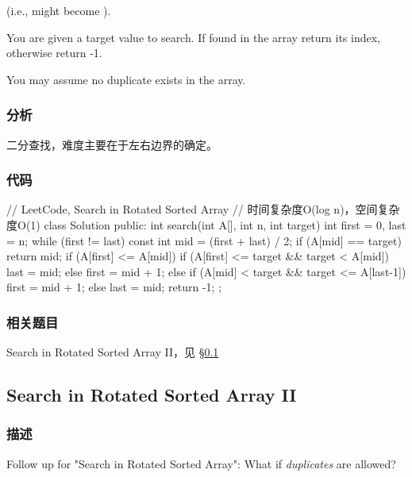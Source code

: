 (i.e.,  might become ).

You are given a target value to search. If found in the array return its index, otherwise return -1.

You may assume no duplicate exists in the array.


\subsubsection{分析}
二分查找，难度主要在于左右边界的确定。


\subsubsection{代码}
\begin{Code}
// LeetCode, Search in Rotated Sorted Array
// 时间复杂度O(log n)，空间复杂度O(1)
class Solution {
public:
    int search(int A[], int n, int target) {
        int first = 0, last = n;
        while (first != last) {
            const int mid = (first + last) / 2;
            if (A[mid] == target)
                return mid;
            if (A[first] <= A[mid]) {
                if (A[first] <= target && target < A[mid])
                    last = mid;
                else
                    first = mid + 1;
            } else {
                if (A[mid] < target && target <= A[last-1])
                    first = mid + 1;
                else
                    last = mid;
            }
        }
        return -1;
    }
};
\end{Code}


\subsubsection{相关题目}

\begindot
\item Search in Rotated Sorted Array II，见 \S \ref{sec:search-in-rotated-sorted-array-ii}
\myenddot


\subsection{Search in Rotated Sorted Array II}
\label{sec:search-in-rotated-sorted-array-ii}


\subsubsection{描述}
Follow up for "Search in Rotated Sorted Array": What if \emph{duplicates} are allowed?

